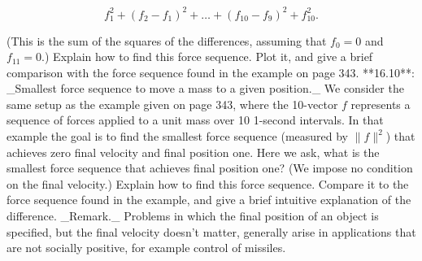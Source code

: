 \[f_{1}^{2}+(f_{2}-f_{1})^{2}+\dots+(f_{10}-f_{9})^{2}+f_{10}^{2}.\]

(This is the sum of the squares of the differences, assuming that \(f_{0}=0\) and \(f_{11}=0\).) Explain how to find this force sequence. Plot it, and give a brief comparison with the force sequence found in the example on page 343.
**16.10**: _Smallest force sequence to move a mass to a given position._ We consider the same setup as the example given on page 343, where the 10-vector \(f\) represents a sequence of forces applied to a unit mass over 10 1-second intervals. In that example the goal is to find the smallest force sequence (measured by \(\|f\|^{2}\)) that achieves zero final velocity and final position one. Here we ask, what is the smallest force sequence that achieves final position one? (We impose no condition on the final velocity.) Explain how to find this force sequence. Compare it to the force sequence found in the example, and give a brief intuitive explanation of the difference. _Remark._ Problems in which the final position of an object is specified, but the final velocity doesn't matter, generally arise in applications that are not socially positive, for example control of missiles.

 